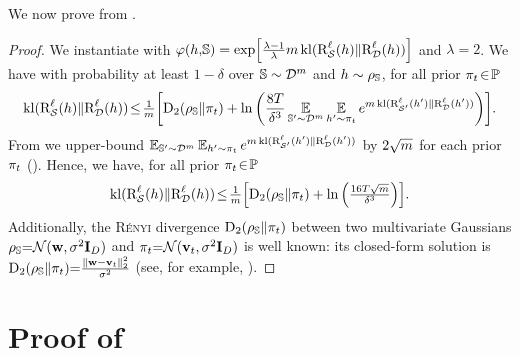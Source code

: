 \begin{noaddcontents}
We now prove  from .\\

\corollarynn*
\begin{proof}
We instantiate  with $\varphi(h,\!\mathbb{S})=\exp\!\left[\tfrac{\lambda-1}{\lambda}m\operatorname{kl}(\text{R}^{\ell}_{\mathcal{S}}(h)\|\text{R}^{\ell}_{\mathcal{D}}(h))\right]$ and $\lambda=2$. 
We have with probability at least $1-\delta$ over $\mathbb{S}\sim\mathcal{D}^m$ and $h\sim\rho_{\mathbb{S}}$, for all prior $\pi_t\!\in\! \mathbb{P}$ 
\begin{align*}
    \operatorname{kl}(\text{R}^{\ell}_{\mathcal{S}}(h)\|\text{R}^{\ell}_{\mathcal{D}}(h))\! 
    \le \! \tfrac{1}{m}\!\left[ \operatorname{D}_{2}(\rho_{\mathbb{S}}\|\pi_t)+ \ln\left(\frac{8T}{\delta^3}\operatorname*{\mathbb{E}}_{\mathbb{S}'{\sim}\mathcal{D}^{m}}\operatorname*{\mathbb{E}}_{h'{\sim}\pi_t}e^{m\operatorname{kl}(\text{R}^{\ell}_{\mathcal{S}'}(h')\|\text{R}^{\ell}_{\mathcal{D}}(h'))}\right) \right]\!.
\end{align*}
From \citet{Maurer2004} we upper-bound  $\operatorname*{\mathbb{E}}_{\mathbb{S}'{\sim}\mathcal{D}^m}\operatorname*{\mathbb{E}}_{h'{\sim}\pi_t} e^{m\operatorname{kl}(\text{R}^{\ell}_{\mathcal{S}'}(h')\|\text{R}^{\ell}_{\mathcal{D}}(h'))}$ by $2\sqrt{m}$ for each prior $\pi_t$ (). 
Hence, we have, for all prior $\pi_t\!\in\! \mathbb{P}$ 
\begin{align*}
    \operatorname{kl}(\text{R}^{\ell}_{\mathcal{S}}(h)\|\text{R}^{\ell}_{\mathcal{D}}(h))\! 
    \le \! \tfrac{1}{m}\!\left[ \operatorname{D}_{2}(\rho_{\mathbb{S}}\|\pi_t)+ \ln\left(\tfrac{16T\sqrt{m}}{\delta^3}\right) \right]\!.
\end{align*}
Additionally, the \textsc{Rényi} divergence $\operatorname{D}_{2}(\rho_{\mathbb{S}}\|\pi_t)$ between two multivariate Gaussians $\rho_{\mathbb{S}}{=}\mathcal{N}(\mathbf{w}, \sigma^2\mathbf{I}_{D})$ and $\pi_t{=}\mathcal{N}(\mathbf{v}_t, \sigma^2\mathbf{I}_{D})$ is well known: its closed-form solution is $\operatorname{D}_{2}(\rho_{\mathbb{S}}\|\pi_t){=}\frac{\|\mathbf{w}{-}\mathbf{v}_t\|_{2}^{2}}{\sigma^2}$ (see, for example, \citep{GilAlajajiLinder2013}).
\end{proof}

\section{Proof of }
\label{chap:dis-pra:sec:proof-corollary-nn-rbc}


\end{noaddcontents}
